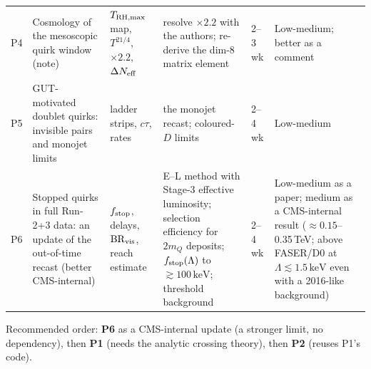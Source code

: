 \documentclass[11pt,a4paper]{article}
\newcommand{\mQ}{m_Q}
\newcommand{\keV}{\ensuremath{\,\mathrm{keV}}}
\begin{document}
{\begin{longtable}{@{}L{0.6cm}L{3.1cm}L{4.1cm}L{3.8cm}L{1.3cm}L{2.6cm}@{}}
P4 & Cosmology of the mesoscopic quirk window (note) & $T_{\rm RH,max}$ map, $T^{21/4}$, $\times2.2$, $\Delta N_{\rm eff}$ & resolve $\times2.2$ with the authors; re-derive the dim-8 matrix element & 2--3 wk & Low-medium; better as a comment\\
P5 & GUT-motivated doublet quirks: invisible pairs and monojet limits & ladder strips, $c\tau$, rates & the monojet recast; coloured-$D$ limits & 2--4 wk & Low-medium\\
P6 & Stopped quirks in full Run-2+3 data: an update of the out-of-time recast (better CMS-internal) & $f_{\rm stop}$, delays, ${\rm BR}_{\rm vis}$, reach estimate & E--L method with Stage-3 effective luminosity; selection efficiency for $2\mQ$ deposits; $f_{\rm stop}(\Lambda)$ to $\gtrsim100\keV$; threshold background & 2--4 wk & Low-medium as a paper; medium as a CMS-internal result ($\approx0.15$--0.35\,TeV; above FASER/D0 at $\Lambda\lesssim1.5\keV$ even with a 2016-like background)\\
\end{longtable}
}
Recommended order: \textbf{P6} as a CMS-internal update (a stronger limit, no dependency), then \textbf{P1} (needs the analytic crossing theory), then \textbf{P2} (reuses P1's code).

\end{document}

